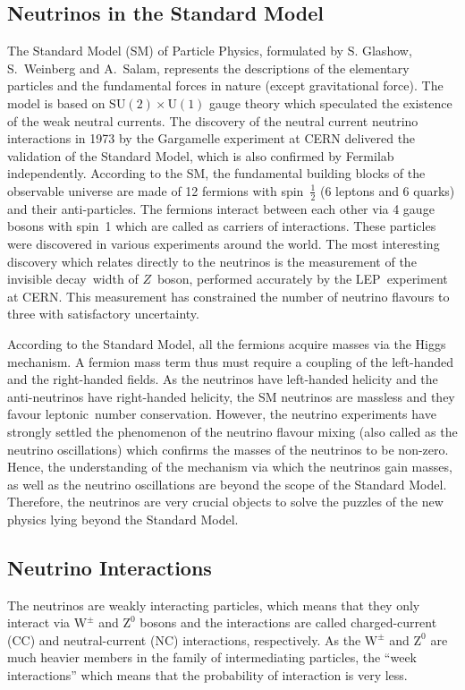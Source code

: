 \subsection{Neutrinos in the Standard Model}
The Standard Model (SM) of Particle Physics, formulated by
S. Glashow, S.~Weinberg and A.~Salam, represents the descriptions of the
elementary particles and the fundamental forces in nature
(except gravitational force)\cite{glashow1959, weinberg1967,abdus1968}.
The model is based on
$\text{SU}\left(2\right)\times\text{U}\left(1\right)$ gauge theory
which speculated the existence of the weak neutral
currents\cite{glashow1961}.
The discovery of the neutral current neutrino interactions in 1973
by the Gargamelle experiment at CERN delivered the validation of the
Standard Model\cite{hasert1973,hasert1973_1,hasert1974}, which is
also confirmed by Fermilab independently\cite{benvenuti1974}.
According to the SM, the fundamental building blocks of the observable
universe are made of 12 fermions with spin~$\frac{1}{2}$ (6 leptons and
6 quarks) and their anti-particles. The fermions interact between
each other via 4 gauge bosons with spin~1 which are called as
carriers of interactions. These particles were discovered in various
experiments around the world. The most interesting discovery which
relates directly to the neutrinos is the measurement of the invisible
decay~width of $Z$~boson, performed accurately by the LEP~experiment
at CERN\cite{numberneut}. This measurement has constrained the number
of neutrino flavours to three with satisfactory uncertainty.

According to the Standard Model, all the fermions acquire masses via
the Higgs mechanism. A fermion mass term thus must require a coupling
of the left-handed and the right-handed fields. As the neutrinos have
left-handed helicity and the anti-neutrinos have right-handed
helicity, the SM neutrinos are massless and they favour
leptonic~number conservation. However, the neutrino experiments have
strongly settled the phenomenon of the neutrino flavour mixing
(also called as the neutrino oscillations) which confirms the masses
of the neutrinos to be non-zero. Hence, the understanding of the
mechanism via which the neutrinos gain masses, as well as the neutrino
oscillations are beyond the scope of the Standard Model. Therefore,
the neutrinos are very crucial objects to solve the puzzles of the
new physics lying beyond the Standard Model.


\subsection{Neutrino Interactions}
The neutrinos are weakly interacting particles, which means that they
only interact via $\mathrm{W}^{\pm}$ and $\mathrm{Z}^{0}$ bosons and the
interactions are called charged-current (CC) and neutral-current (NC)
interactions, respectively. As the $\mathrm{W}^{\pm}$ and
$\mathrm{Z}^{0}$ are much heavier members in the family of
intermediating particles, the ``week interactions'' which means that
the probability of interaction is very less.

